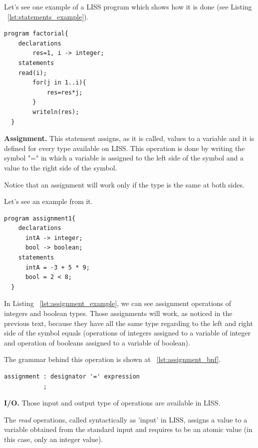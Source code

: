 \documentclass[
  oneside,
  11pt, a4paper,
  footinclude=true,
  headinclude=true,
  cleardoublepage=empty
]{scrbook}
\begin{document}
Let's see one example of a LISS program which shows how it is done (see Listing ~\ref{lst:statements_example}).

\begin{lstlisting}[caption={Example of using statements in LISS},label={lst:statements_example}]
  program factorial{
    declarations
        res=1, i -> integer;
    statements
	read(i);
        for(j in 1..i){
            res=res*j;
        }
        writeln(res);
  }
\end{lstlisting}

\textbf{Assignment.} This statement assigns, as it is called, values to a variable and it is defined for every type available on LISS.
This operation is done by writing the symbol "=" in which a variable is assigned to the left side of the symbol and a value to the right side of the symbol.

Notice that an assignment will work only if the type is the same at both sides.

Let's see an example from it.

\begin{lstlisting}[caption={Example of assignment in LISS},label={lst:assignment_example}]
  program assignment1{
    declarations
      intA -> integer;
      bool -> boolean;  
    statements
      intA = -3 + 5 * 9;
      bool = 2 < 8;
  }
\end{lstlisting}

In Listing ~\ref{lst:assignment_example}, we can see assignment operations of integers and boolean types.
Those assignments will work, as noticed in the previous text, because they have all the same type regarding to the left and right side of the symbol equals (operations of integers assigned to a variable of integer and operation of booleans assigned to a variable of boolean).

The grammar behind this operation is shown at ~\ref{lst:assignment_bnf}.

\begin{lstlisting}[caption={BNF of assignment in LISS},label={lst:assignment_bnf}]
  assignment : designator '=' expression
           ;
\end{lstlisting}

\textbf{I/O.} Those input and output type of operations are available in LISS.

The \textit{read} operations, called syntactically as 'input' in LISS, assigns a value to a variable obtained from the standard input and requires to be an atomic value (in this case, only an integer value).
\end{document}
